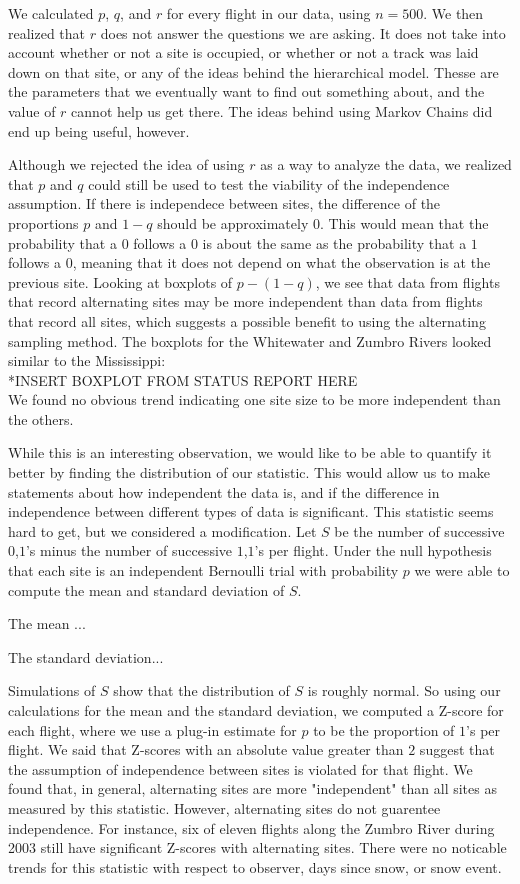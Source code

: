 \documentclass{article}
\begin{document}
	We calculated \(p\), \(q\), and \(r\) for every flight in our data, using 
\(n = 500\).  We then realized that \(r\) does not answer the questions we are 
asking.  It does not take into account whether or not a site is occupied, or 
whether or not a track was laid down on that site, or any of the ideas behind the
hierarchical model.  Thesse are the parameters that we eventually want to find 
out something about, and the value of \(r\) cannot help us get there.  The ideas 
behind using Markov Chains did end up being useful, however.  
	
	Although we rejected the idea of using \(r\) as a way to analyze the data, we
realized that \(p\) and \(q\) could still be used to test the viability of the 
independence assumption.  If there is independece between sites, the difference 
of the proportions \(p\) and \(1-q\) should be approximately \(0\).  This would 
mean that the probability that a \(0\) follows a \(0\) is about the same as the 
probability that a \(1\) follows a \(0\), meaning that it does not depend on what
the observation is at the previous site.  Looking at boxplots of \(p - (1-q)\), 
we see that data from flights that record alternating sites may be more 
independent than data from flights that record all sites, which suggests a 
possible benefit to using the alternating sampling method.  The boxplots for the 
Whitewater and Zumbro Rivers looked similar to the Mississippi:  \\
*INSERT BOXPLOT FROM STATUS REPORT HERE  \\
We found no obvious trend indicating one site size to be more independent than 
the others.  

	While this is an interesting observation, we would like to be able to 
quantify it better by finding the distribution of our statistic.  This would 
allow us to make statements about how independent the data is, and if the 
difference in independence between different types of data is significant.   
This statistic seems hard to get, but we considered a modification.  Let \(S\) be
the number of successive \(0\),\(1\)'s minus the number of successive \(1\),\(1\)'s
per flight.  Under the null hypothesis that each site is an independent Bernoulli
trial with probability \(p\) we were able to compute the mean and standard 
deviation of \(S\).  

	The mean ...

	The standard deviation...

	Simulations of \(S\) show that the distribution of \(S\) is roughly normal.  
So using our calculations for the mean and the standard deviation, we computed
a Z-score for each flight, where we use a plug-in estimate for \(p\) to be the 
proportion of \(1\)'s per flight.  We said that Z-scores with an absolute value 
greater than \(2\) suggest that the assumption of independence between sites is 
violated for that flight.  We found that, in general, alternating sites are more
"independent" than all sites as measured by this statistic.  However, alternating
sites do not guarentee independence.  For instance, six of eleven flights along 
the Zumbro River during 2003 still have significant Z-scores with alternating
sites.  There were no noticable trends for this statistic with respect to 
observer, days since snow, or snow event.
\end{document}
